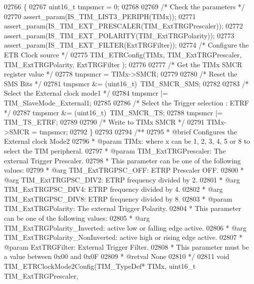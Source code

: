 \begin{DoxyCode}
02766 \{
02767   uint16\_t tmpsmcr = 0;
02768 
02769   \textcolor{comment}{/* Check the parameters */}
02770   assert_param(IS\_TIM\_LIST3\_PERIPH(TIMx));
02771   assert_param(IS\_TIM\_EXT\_PRESCALER(TIM\_ExtTRGPrescaler));
02772   assert_param(IS\_TIM\_EXT\_POLARITY(TIM\_ExtTRGPolarity));
02773   assert_param(IS\_TIM\_EXT\_FILTER(ExtTRGFilter));
02774   \textcolor{comment}{/* Configure the ETR Clock source */}
02775   TIM_ETRConfig(TIMx, TIM\_ExtTRGPrescaler, TIM\_ExtTRGPolarity, ExtTRGFilter
      );
02776 
02777   \textcolor{comment}{/* Get the TIMx SMCR register value */}
02778   tmpsmcr = TIMx->SMCR;
02779 
02780   \textcolor{comment}{/* Reset the SMS Bits */}
02781   tmpsmcr &= (uint16\_t)~TIM_SMCR_SMS;
02782 
02783   \textcolor{comment}{/* Select the External clock mode1 */}
02784   tmpsmcr |= TIM_SlaveMode_External1;
02785 
02786   \textcolor{comment}{/* Select the Trigger selection : ETRF */}
02787   tmpsmcr &= (uint16\_t)~TIM_SMCR_TS;
02788   tmpsmcr |= TIM_TS_ETRF;
02789 
02790   \textcolor{comment}{/* Write to TIMx SMCR */}
02791   TIMx->SMCR = tmpsmcr;
02792 \}
02793 
02794 \textcolor{comment}{/**}
02795 \textcolor{comment}{  * @brief  Configures the External clock Mode2}
02796 \textcolor{comment}{  * @param  TIMx: where x can be  1, 2, 3, 4, 5 or 8 to select the TIM peripheral.}
02797 \textcolor{comment}{  * @param  TIM\_ExtTRGPrescaler: The external Trigger Prescaler.}
02798 \textcolor{comment}{  *          This parameter can be one of the following values:}
02799 \textcolor{comment}{  *            @arg TIM\_ExtTRGPSC\_OFF: ETRP Prescaler OFF.}
02800 \textcolor{comment}{  *            @arg TIM\_ExtTRGPSC\_DIV2: ETRP frequency divided by 2.}
02801 \textcolor{comment}{  *            @arg TIM\_ExtTRGPSC\_DIV4: ETRP frequency divided by 4.}
02802 \textcolor{comment}{  *            @arg TIM\_ExtTRGPSC\_DIV8: ETRP frequency divided by 8.}
02803 \textcolor{comment}{  * @param  TIM\_ExtTRGPolarity: The external Trigger Polarity.}
02804 \textcolor{comment}{  *          This parameter can be one of the following values:}
02805 \textcolor{comment}{  *            @arg TIM\_ExtTRGPolarity\_Inverted: active low or falling edge active.}
02806 \textcolor{comment}{  *            @arg TIM\_ExtTRGPolarity\_NonInverted: active high or rising edge active.}
02807 \textcolor{comment}{  * @param  ExtTRGFilter: External Trigger Filter.}
02808 \textcolor{comment}{  *          This parameter must be a value between 0x00 and 0x0F}
02809 \textcolor{comment}{  * @retval None}
02810 \textcolor{comment}{  */}
02811 \textcolor{keywordtype}{void} TIM_ETRClockMode2Config(TIM\_TypeDef* TIMx, uint16\_t TIM\_ExtTRGPrescaler,

\end{DoxyCode}
